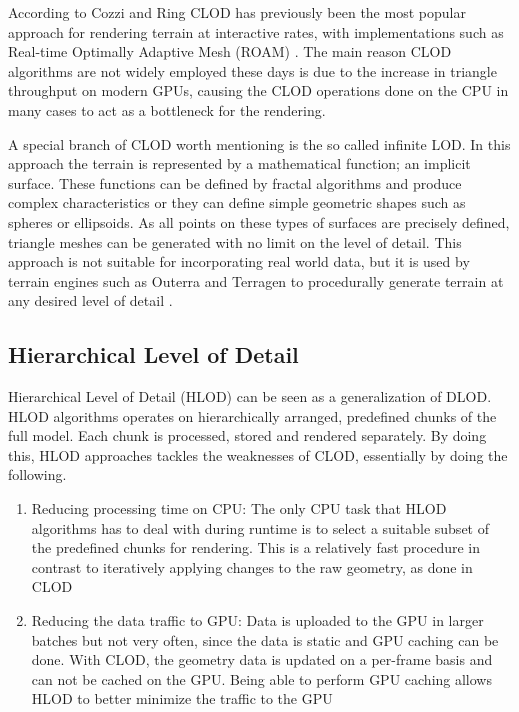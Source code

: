 According to Cozzi and Ring \cite[p. 368]{cozzi11} CLOD has previously been the most popular approach for rendering terrain at interactive rates, with implementations such as Real-time Optimally Adaptive Mesh (ROAM) \cite{roam}. The main reason CLOD algorithms are not widely employed these days is due to the increase in triangle throughput on modern GPUs, causing the CLOD operations done on the CPU in many cases to act as a bottleneck for the rendering.

A special branch of CLOD worth mentioning is the so called infinite LOD. In this approach the terrain is represented by a mathematical function; an implicit surface. These functions can be defined by fractal algorithms and produce complex characteristics or they can define simple geometric shapes such as spheres or ellipsoids. As all points on these types of surfaces are precisely defined, triangle meshes can be generated with no limit on the level of detail. This approach is not suitable for incorporating real world data, but it is used by terrain engines such as Outerra and Terragen to procedurally generate terrain at any desired level of detail \cite{outerraprocedural09} \cite{terragen}. 

\subsection{Hierarchical Level of Detail}
\label{section:hlod}
Hierarchical Level of Detail (HLOD) can be seen as a generalization of DLOD. HLOD algorithms operates on hierarchically arranged, predefined chunks of the full model. Each chunk is processed, stored and rendered separately. By doing this, HLOD approaches tackles the weaknesses of CLOD, essentially by doing the following.

\begin{enumerate}
    \item Reducing processing time on CPU: The only CPU task that HLOD algorithms has to deal with during runtime is to select a suitable subset of the predefined chunks for rendering. This is a relatively fast procedure in contrast to iteratively applying changes to the raw geometry, as done in CLOD
    \item Reducing the data traffic to GPU: Data is uploaded to the GPU in larger batches but not very often, since the data is static and GPU caching can be done. With CLOD, the geometry data is updated on a per-frame basis and can not be cached on the GPU. Being able to perform GPU caching allows HLOD to better minimize the traffic to the GPU
\end{enumerate}

